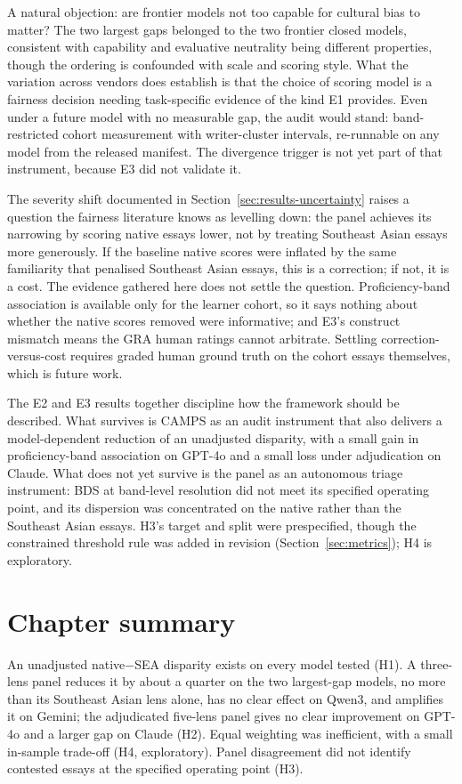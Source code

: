 A natural objection: are frontier models not too capable for
cultural bias to matter? The two largest gaps belonged to the two
frontier closed models, consistent with capability and evaluative
neutrality being different properties, though the ordering is
confounded with scale and scoring style. What the variation across
vendors does establish is that the choice of scoring model is a
fairness decision needing task-specific evidence of the kind E1
provides. Even under a future model with no measurable gap, the
audit would stand: band-restricted cohort measurement with
writer-cluster intervals, re-runnable on any model from the
released manifest. The divergence trigger is not yet part of that
instrument, because E3 did not validate it.

The severity shift documented in
Section~\ref{sec:results-uncertainty} raises a question the fairness
literature knows as levelling down: the panel achieves its
narrowing by scoring native essays lower, not by treating Southeast
Asian essays more generously. If the baseline native scores
were inflated by the same familiarity that penalised Southeast Asian
essays, this is a correction; if not, it is a cost. The evidence
gathered here does not settle the question. Proficiency-band
association is available only for the learner cohort, so it says
nothing about whether the native scores removed were informative;
and E3's construct mismatch means the GRA human ratings cannot
arbitrate. Settling correction-versus-cost requires graded human
ground truth on the cohort essays themselves, which is future work.

The E2 and E3 results together discipline how the framework should
be described. What survives is CAMPS as an audit instrument that
also delivers a model-dependent reduction of an unadjusted
disparity, with a small gain in proficiency-band association on
GPT-4o and a small loss under adjudication on Claude. What does not yet survive is the panel as an autonomous
triage instrument: BDS at band-level resolution did not meet its
specified operating point, and its dispersion was concentrated on
the native rather than the Southeast Asian essays. H3's target and split were prespecified, though the constrained
threshold rule was added in revision (Section~\ref{sec:metrics});
H4 is exploratory.

\section*{Chapter summary}
An unadjusted native$-$SEA disparity exists on every model tested
(H1). A three-lens panel reduces it by about a quarter on the two
largest-gap models, no more than its Southeast Asian lens alone,
has no clear effect on Qwen3, and amplifies it on Gemini; the
adjudicated five-lens panel gives no clear improvement on GPT-4o and
a larger gap on Claude (H2). Equal weighting was inefficient, with a
small in-sample trade-off (H4, exploratory). Panel disagreement did
not identify contested essays at the specified operating point (H3).
